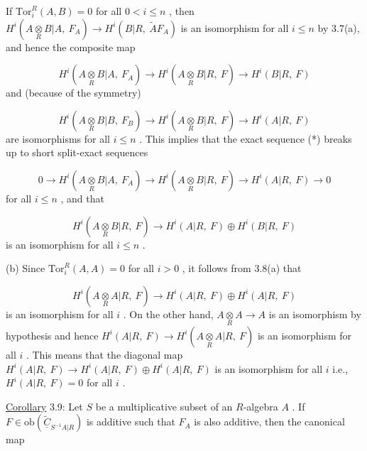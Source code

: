 If  $\mathrm{Tor}^{R}_{i}(A, B) = 0$  for all  $0 < i \leq n$  , then  $H^{i}(A\underset{R}{\otimes}B|A,\ F_{A}) \rightarrow H^{i}(B|R,\ \widetilde{A}F_{A})$  is an isomorphism for all  $i \leq n$  by 3.7(a), and hence the composite map

\begin{equation*}
H^{i}(A\underset{R}{\otimes}B|A,\ F_{A}) \rightarrow H^{i}(A\underset{R}{\otimes}B|R,\ F) \rightarrow H^{i}(B|R,\ F)
\end{equation*}
and (because of the symmetry) 



\begin{equation*}
 H^{i}(A\underset{R}{\otimes}B|B,\ F_{B}) \rightarrow H^{i}(A\underset{R}{\otimes}B|R,\ F) \rightarrow H^{i}(A|R,\ F)
\end{equation*}
are isomorphisms for all  $i \leq n$  . This implies that the exact sequence (*) breaks up to short split-exact sequences

\begin{equation*}
0 \rightarrow H^{i}(A\underset{R}{\otimes}B|A,\ F_{A}) \rightarrow H^{i}(A\underset{R}{\otimes}B|R,\ F) \rightarrow H^{i}(A|R,\ F) \rightarrow 0
\end{equation*}
for all  $i \leq n$  , and that

\begin{equation*}
H^{i}(A\underset{R}{\otimes}B|R,\ F) \rightarrow H^{i}(A|R,\ F) \oplus H^{i}(B|R,\ F)
\end{equation*}
is an isomorphism for all  $i \leq n$  .

(b)  Since  $\mathrm{Tor}^{R}_{i}(A,A) = 0$  for all  $i > 0$  , it follows from 3.8(a) that

\begin{equation*}
H^{i}(A\underset{R}{\otimes}A|R,\ F) \rightarrow H^{i}(A|R,\ F) \oplus H^{i}(A|R,\ F)
\end{equation*}
is an isomorphism for all  $i$  . On the other hand,  $A\underset{R}{\otimes}A \rightarrow A$  is an isomorphism by hypothesis and hence  $H^{i}(A|R,\ F) \rightarrow H^{i}(A\underset{R}{\otimes}A|R,\ F)$  is an isomorphism for all  $i$  . This means that the diagonal map  $H^{i}(A|R,\ F) \rightarrow H^{i}(A|R,\ F) \oplus H^{i}(A|R,\ F)$  is an isomorphism for all  $i$  i.e.,  $H^{i}(A|R,\ F) = 0$  for all  $i$  .

\underline{Corollary} 3.9:  Let  $S$  be a multiplicative subset of an $R$-algebra  $A$  . If  $F \in \mathrm{ob}\!\left(\widetilde{\underline{C}}_{S^{-1}A|R}\right)$  is additive such that  $F_{A}$  is also additive, then the canonical map


